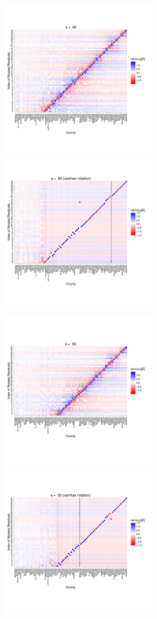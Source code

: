 \documentclass{article} %
\begin{document}
\includegraphics[width=0.5\textwidth]{RandomSlope_s60.pdf}
\includegraphics[width=0.5\textwidth]{RandomSlope_s60_varimax.pdf}

\includegraphics[width=0.5\textwidth]{RandomSlope_s50.pdf}
\includegraphics[width=0.5\textwidth]{RandomSlope_s50_varimax.pdf}
\end{document}
